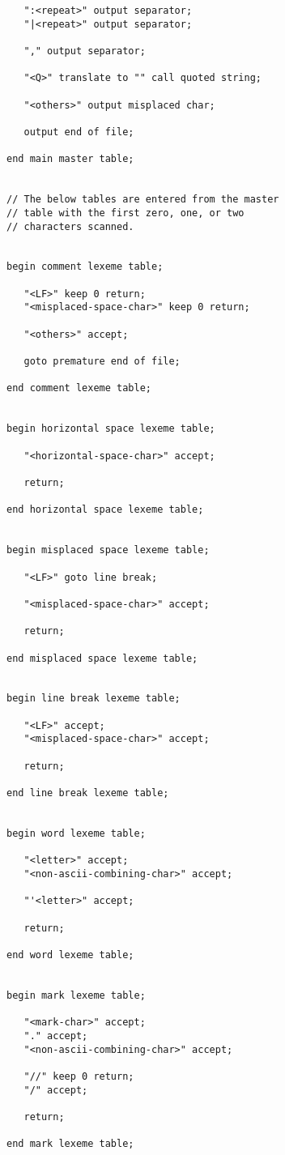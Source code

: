 \documentclass[12pt]{article}
\newenvironment{indpar}[1][0.3in]%
	{\begin{list}{}%
		     {\setlength{\itemsep}{0in}%
		      \setlength{\topsep}{0in}%
		      \setlength{\parsep}{1ex}%
		      \setlength{\labelwidth}{#1}%
		      \setlength{\leftmargin}{#1}%
		      \addtolength{\leftmargin}{\labelsep}}%
	 \item}%
	{\end{list}}
\begin{document}
\begin{indpar}
\begin{verbatim}
   ":<repeat>" output separator;
   "|<repeat>" output separator;

   "," output separator;

   "<Q>" translate to "" call quoted string;

   "<others>" output misplaced char;

   output end of file;

end main master table;


// The below tables are entered from the master
// table with the first zero, one, or two
// characters scanned.


begin comment lexeme table;

   "<LF>" keep 0 return;
   "<misplaced-space-char>" keep 0 return;

   "<others>" accept;

   goto premature end of file;

end comment lexeme table;


begin horizontal space lexeme table;

   "<horizontal-space-char>" accept;

   return;

end horizontal space lexeme table;


begin misplaced space lexeme table;

   "<LF>" goto line break;

   "<misplaced-space-char>" accept;

   return;

end misplaced space lexeme table;


begin line break lexeme table;

   "<LF>" accept;
   "<misplaced-space-char>" accept;

   return;

end line break lexeme table;


begin word lexeme table;

   "<letter>" accept;
   "<non-ascii-combining-char>" accept;

   "'<letter>" accept;

   return;

end word lexeme table;


begin mark lexeme table;

   "<mark-char>" accept;
   "." accept;
   "<non-ascii-combining-char>" accept;

   "//" keep 0 return;
   "/" accept;

   return;

end mark lexeme table;



\end{verbatim}
\end{indpar}
\end{document}
